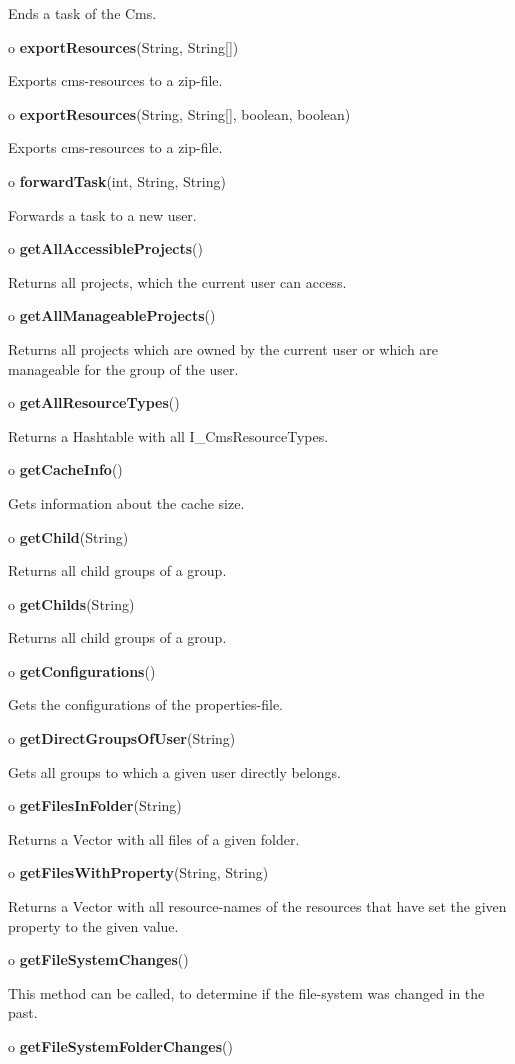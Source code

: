 \begin{description}
Ends a task of the Cms.  
\item o {\bf exportResources}(String, String[])  

Exports cms-resources to a zip-file.  
\item o {\bf exportResources}(String, String[], boolean, boolean)  

Exports cms-resources to a zip-file.  
\item o {\bf forwardTask}(int, String, String)  

Forwards a task to a new user.  
\item o {\bf getAllAccessibleProjects}()  

Returns all projects, which the current user can access.  
\item o {\bf getAllManageableProjects}()  

Returns all projects which are owned by the current user or which are
manageable for the group of the user.  
\item o {\bf getAllResourceTypes}()  

Returns a Hashtable with all I\_CmsResourceTypes.  
\item o {\bf getCacheInfo}()  

Gets information about the cache size.  
\item o {\bf getChild}(String)  

Returns all child groups of a group.  
\item o {\bf getChilds}(String)  

Returns all child groups of a group.  
\item o {\bf getConfigurations}()  

Gets the configurations of the properties-file.  
\item o {\bf getDirectGroupsOfUser}(String)  

Gets all groups to which a given user directly belongs.  
\item o {\bf getFilesInFolder}(String)  

Returns a Vector with all files of a given folder.  
\item o {\bf getFilesWithProperty}(String, String)  

Returns a Vector with all resource-names of the resources that have set the
given property to the given value.  
\item o {\bf getFileSystemChanges}()  

This method can be called, to determine if the file-system was changed in the
past.  
\item o {\bf getFileSystemFolderChanges}()  


\end{description}
